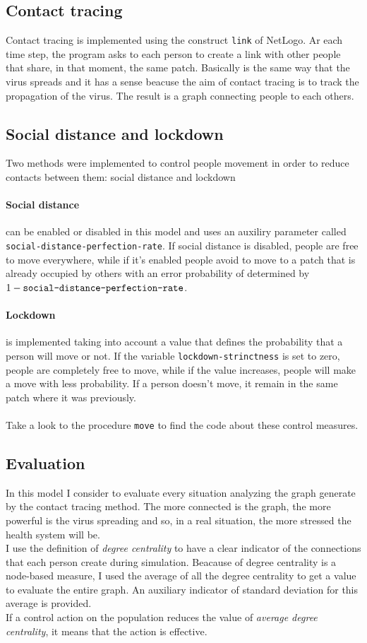 \documentclass[12pt]{llncs}
\begin{document}
\subsection{Contact tracing}
Contact tracing is implemented using the construct \texttt{link} of NetLogo. Ar each time step, the program asks to each person to create a link with other people that share, in that moment, the same patch. Basically is the same way that the virus spreads and it has a sense beacuse the aim of contact tracing is to track the propagation of the virus. The result is a graph connecting people to each others.

\subsection{Social distance and lockdown}
Two methods were implemented to control people movement in order to reduce contacts between them: social distance and lockdown
\paragraph{Social distance} can be enabled or disabled in this model and uses an auxiliry parameter called \texttt{social-distance-perfection-rate}. If social distance is disabled, people are free to move everywhere, while if it's enabled people avoid to move to a patch that is already occupied by others with an error probability of determined by $1 - \textrm{\texttt{social-distance-perfection-rate}}$.
\paragraph{Lockdown} is implemented taking into account a value that defines the probability that a person will move or not. If the variable \texttt{lockdown-strinctness} is set to zero, people are completely free to move, while if the value increases, people will make a move with less probability. If a person doesn't move, it remain in the same patch where it was previously.\\ \\
Take a look to the procedure \texttt{move} to find the code about these control measures.


\subsection{Evaluation}
In this model I consider to evaluate every situation analyzing the graph generate by the contact tracing method. The more connected is the graph, the more powerful is the virus spreading and so, in a real situation, the more stressed the health system will be.\\
I use the definition of \textit{degree centrality} to have a clear indicator of the connections that each person create during simulation. Beacause of degree centrality is a node-based measure, I used the average of all the degree centrality to get a value to evaluate the entire graph. An auxiliary indicator of standard deviation for this average is provided. \\
If a control action on the population reduces the value of \textit{average degree centrality}, it means that the action is effective.
\end{document}
